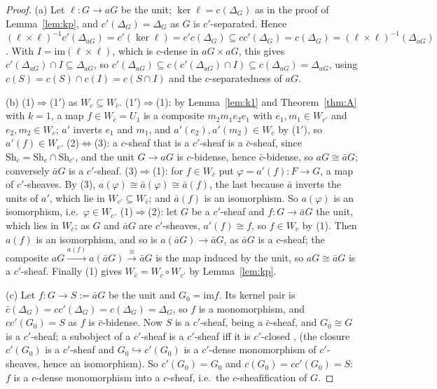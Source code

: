 \documentclass[11pt]{amsart}
\theoremstyle{definition}
\newcommand{\im}{\mathrm{im}}
\newcommand{\Sh}{\mathrm{Sh}}
\begin{document}
\begin{proof}
(a) Let $\ell\colon G\to aG$ be the unit; $\ker\ell=c(\Delta_G)$ as in the
proof of Lemma~\ref{lem:kp}, and $c'(\Delta_G)=\Delta_G$ as $G$ is
$c'$-separated. Hence $(\ell\times\ell)^{-1}c'(\Delta_{aG})=c'(\ker\ell)=
c'c(\Delta_G)\subseteq cc'(\Delta_G)=c(\Delta_G)=(\ell\times\ell)^{-1}
(\Delta_{aG})$. With $I=\im(\ell\times\ell)$, which is $c$-dense in
$aG\times aG$, this gives $c'(\Delta_{aG})\cap I\subseteq\Delta_{aG}$, so
$c'(\Delta_{aG})\subseteq c(c'(\Delta_{aG})\cap I)\subseteq c(\Delta_{aG})
=\Delta_{aG}$, using $c(S)=c(S)\cap c(I)=c(S\cap I)$ and the
$c$-separatedness of $aG$.

(b) (1)$\Rightarrow$(1$'$) as $W_c\subseteq W_{\bar c}$. (1$'$)$\Rightarrow$(1):
by Lemma~\ref{lem:k1} and Theorem~\ref{thm:A} with $k=1$, a map $f\in
W_{\bar c}=U_1$ is a composite $m_2m_1e_2e_1$ with $e_1,m_1\in W_{c'}$ and
$e_2,m_2\in W_c$; $a'$ inverts $e_1$ and $m_1$, and $a'(e_2),a'(m_2)\in
W_c$ by (1$'$), so $a'(f)\in W_c$. (2)$\Leftrightarrow$(3): a $c$-sheaf that is a $c'$-sheaf is a
$\bar c$-sheaf, since $\Sh_{\bar c}=\Sh_c\cap\Sh_{c'}$, and the unit
$G\to aG$ is $c$-bidense, hence $\bar c$-bidense, so $aG\cong\bar aG$;
conversely $\bar aG$ is a $c'$-sheaf. (3)$\Rightarrow$(1): for $f\in
W_{\bar c}$ put $\varphi=a'(f)\colon F\to G$, a map of $c'$-sheaves. By
(3), $a(\varphi)\cong\bar a(\varphi)\cong\bar a(f)$, the last because
$\bar a$ inverts the units of $a'$, which lie in $W_{c'}\subseteq
W_{\bar c}$; and $\bar a(f)$ is an isomorphism. So $a(\varphi)$ is an
isomorphism, i.e.\ $\varphi\in W_c$. (1)$\Rightarrow$(2): let $G$ be a
$c'$-sheaf and $f\colon G\to\bar aG$ the unit, which lies in $W_{\bar c}$;
as $G$ and $\bar aG$ are $c'$-sheaves, $a'(f)\cong f$, so $f\in W_c$ by
(1). Then $a(f)$ is an isomorphism, and so is $a(\bar aG)\to\bar aG$, as
$\bar aG$ is a $c$-sheaf; the composite $aG\xrightarrow{a(f)}a(\bar aG)
\xrightarrow{\ \cong\ }\bar aG$ is the map induced by the unit, so
$aG\cong\bar aG$ is a $c'$-sheaf. Finally (1) gives $W_{\bar c}=
W_c\circ W_{c'}$ by Lemma~\ref{lem:kp}.

(c) Let $f\colon G\to S:=\bar aG$ be the unit and $G_0=\im f$. Its kernel
pair is $\bar c(\Delta_G)=cc'(\Delta_G)=c(\Delta_G)=\Delta_G$, so $f$ is a
monomorphism, and $cc'(G_0)=S$ as $f$ is $\bar c$-bidense. Now $S$ is a
$c'$-sheaf, being a $\bar c$-sheaf, and $G_0\cong G$ is a $c'$-sheaf; a
subobject of a $c'$-sheaf is a $c'$-sheaf iff it is $c'$-closed
\cite[V.3]{MLM}, \cite[A4.3]{Elephant} (the closure $c'(G_0)$ is a
$c'$-sheaf and $G_0\hookrightarrow c'(G_0)$ is a $c'$-dense monomorphism of
$c'$-sheaves, hence an isomorphism). So $c'(G_0)=G_0$ and $c(G_0)=
cc'(G_0)=S$: $f$ is a $c$-dense monomorphism into a $c$-sheaf, i.e.\ the
$c$-sheafification of $G$.
\end{proof}
\end{document}
